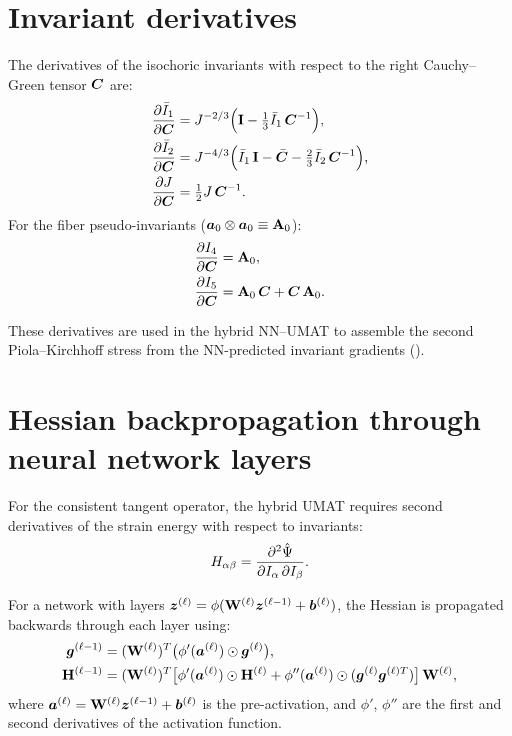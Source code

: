 
\section{Invariant derivatives}
\label{app:invariant_derivatives}

The derivatives of the isochoric invariants with respect to the right
Cauchy--Green tensor $\bm{C}$ are:
\begin{align}
  \frac{\partial \bar{I}_1}{\partial \bm{C}} &= J^{-2/3}\Bigl(\mathbf{I}
    - \tfrac{1}{3}\bar{I}_1\,\bm{C}^{-1}\Bigr), \\
  \frac{\partial \bar{I}_2}{\partial \bm{C}} &= J^{-4/3}\Bigl(\bar{I}_1\,\mathbf{I}
    - \bar{\bm{C}} - \tfrac{2}{3}\bar{I}_2\,\bm{C}^{-1}\Bigr), \\
  \frac{\partial J}{\partial \bm{C}} &= \tfrac{1}{2}J\,\bm{C}^{-1}.
\end{align}
For the fiber pseudo-invariants ($\bm{a}_0 \otimes \bm{a}_0 \equiv
\mathbf{A}_0$):
\begin{align}
  \frac{\partial I_4}{\partial \bm{C}} &= \mathbf{A}_0, \\
  \frac{\partial I_5}{\partial \bm{C}} &= \mathbf{A}_0\,\bm{C} + \bm{C}\,\mathbf{A}_0.
\end{align}

These derivatives are used in the hybrid NN--UMAT to assemble the second
Piola--Kirchhoff stress from the NN-predicted invariant gradients
().

\section{Hessian backpropagation through neural network layers}
\label{app:hessian_backprop}

For the consistent tangent operator, the hybrid UMAT requires second
derivatives of the strain energy with respect to invariants:
\begin{equation}
  H_{\alpha\beta} = \frac{\partial^2 \hat{\Psi}}
    {\partial I_\alpha \, \partial I_\beta}.
\end{equation}

For a network with layers $\bm{z}^{(\ell)} = \phi(\mathbf{W}^{(\ell)}
\bm{z}^{(\ell-1)} + \bm{b}^{(\ell)})$, the Hessian is propagated
backwards through each layer using:
\begin{align}
  \bm{g}^{(\ell-1)} &= (\mathbf{W}^{(\ell)})^T
    \bigl(\phi'(\bm{a}^{(\ell)}) \odot \bm{g}^{(\ell)}\bigr), \\
  \mathbf{H}^{(\ell-1)} &= (\mathbf{W}^{(\ell)})^T
    \bigl[\phi'(\bm{a}^{(\ell)}) \odot \mathbf{H}^{(\ell)}
    + \phi''(\bm{a}^{(\ell)}) \odot
      (\bm{g}^{(\ell)} \bm{g}^{(\ell)T})\bigr]\,\mathbf{W}^{(\ell)},
\end{align}
where $\bm{a}^{(\ell)} = \mathbf{W}^{(\ell)}\bm{z}^{(\ell-1)} +
\bm{b}^{(\ell)}$ is the pre-activation, and $\phi'$, $\phi''$ are the first
and second derivatives of the activation function.

